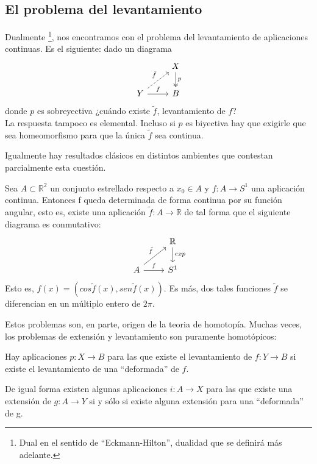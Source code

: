 \subsection*{El problema del levantamiento}
Dualmente \footnote{Dual en el sentido de ``Eckmann-Hilton'', dualidad que se definirá más adelante.},
nos encontramos con el problema del levantamiento de aplicaciones continuas. Es el siguiente: dado un diagrama
$$
\begin{tikzcd}
	{}	& X \dar[two heads]{p} \\
	Y \urar[dashed]{\tilde{f}} \rar{f} & B
\end{tikzcd}
$$
donde $p$ es sobreyectiva ¿cuándo existe $\tilde{f}$, levantamiento de $f$?\\ 
La respuesta tampoco es elemental. Incluso si $p$ es biyectiva hay que exigirle que sea homeomorfismo para que la única $\tilde{f}$ sea continua.\par

Igualmente hay resultados clásicos en distintos ambientes que contestan parcialmente esta cuestión.

\begin{teor} 
Sea $A \subset \mathbb{R}^2$ un conjunto estrellado respecto a $x_{0} \in A$ y $f : A \longrightarrow S^{1}$ una aplicación continua. Entonces f queda determinada de forma continua por su función angular, esto es, existe una aplicación $\tilde{f} : A \longrightarrow \mathbb{R}$ de tal forma que el siguiente diagrama es conmutativo:
$$
\begin{tikzcd}
	{}	& \mathbb{R} \dar{exp} \\
	A \urar{\tilde{f}} \rar{f} & S^1
\end{tikzcd}
$$
Esto es, $f(x) = (cos\tilde{f}(x), sen\tilde{f}(x))$. Es más, dos tales funciones $\tilde{f}$ se diferencian en un múltiplo entero de $2\pi$.
\end{teor}

Estos problemas son, en parte, origen de la teoria de homotopía. Muchas veces, los problemas de extensión y levantamiento son puramente homotópicos: \par

Hay aplicaciones $p : X \longrightarrow B$ para las que existe el levantamiento de $f : Y \longrightarrow B$ si existe el levantamiento de una ``deformada'' de $f$. \par
De igual forma existen algunas aplicaciones $i : A \longrightarrow X$ para las que existe una extensión de $g : A \longrightarrow Y$ si y sólo si existe alguna extensión para una ``deformada'' de g. \par

